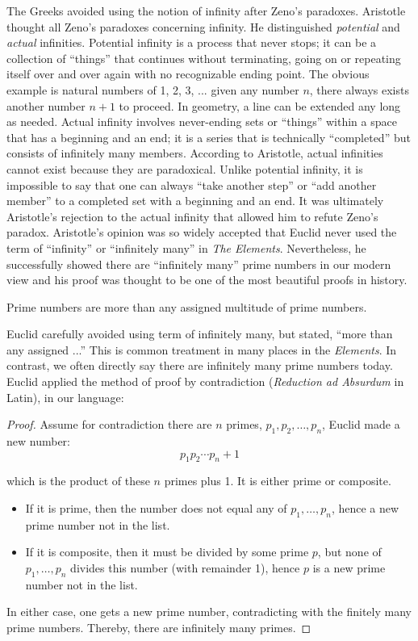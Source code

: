 \documentclass[b5paper]{article}
\begin{document}
The Greeks avoided using the notion of infinity after Zeno's paradoxes. Aristotle thought all Zeno's paradoxes concerning infinity. He distinguished {\em potential} and {\em actual} infinities. Potential infinity is a process that never stops; it can be a collection of \enquote{things} that continues without terminating, going on or repeating itself over and over again with no recognizable ending point. The obvious example is natural numbers of 1, 2, 3, ... given any number $n$, there always exists another number $n + 1$ to proceed. In geometry, a line can be extended any long as needed. Actual infinity involves never-ending sets or \enquote{things} within a space that has a beginning and an end; it is a series that is technically \enquote{completed} but consists of infinitely many members. According to Aristotle, actual infinities cannot exist because they are paradoxical. Unlike potential infinity, it is impossible to say that one can always \enquote{take another step} or \enquote{add another member} to a completed set with a beginning and an end. It was ultimately Aristotle's rejection to the actual infinity that allowed him to refute Zeno's paradox. Aristotle's opinion was so widely accepted that Euclid never used the term of \enquote{infinity} or \enquote{infinitely many} in \emph{The Elements}. Nevertheless, he successfully showed there are \enquote{infinitely many} prime numbers in our modern view and his proof was thought to be one of the most beautiful proofs in history.

\begin{theorem}
Prime numbers are more than any assigned multitude of prime numbers.
\end{theorem}

Euclid carefully avoided using term of infinitely many, but stated, \enquote{more than any assigned ...} This is common treatment in many places in the \emph{Elements}. In contrast, we often directly say there are infinitely many prime numbers today. Euclid applied the method of proof by contradiction (\emph{Reduction ad Absurdum} in Latin), in our language:

\begin{proof}
Assume for contradiction there are $n$ primes, $p_1, p_2, \dotsc, p_n$, Euclid made a new number:
\[
p_1 p_2 \dotsm p_n + 1
\]

which is the product of these $n$ primes plus 1. It is either prime or composite.

\begin{itemize}
\item If it is prime, then the number does not equal any of $p_1, \dotsc, p_n$, hence a new prime number not in the list.
\item If it is composite, then it must be divided by some prime $p$, but none of $p_1, \dotsc, p_n$ divides this number (with remainder 1), hence $p$ is a new prime number not in the list.
\end{itemize}

In either case, one gets a new prime number, contradicting with the finitely many prime numbers. Thereby, there are infinitely many primes.
\end{proof}
\end{document}
